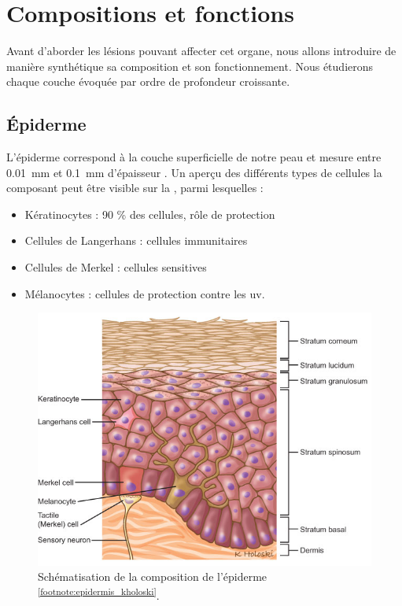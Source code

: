 \section{Compositions et fonctions}
Avant d’aborder les lésions pouvant affecter cet organe, nous allons introduire de manière synthétique sa composition et son fonctionnement. Nous étudierons chaque couche évoquée par ordre de profondeur croissante.\par

\subsection{Épiderme}
L’épiderme correspond à la couche superficielle de notre peau et mesure entre \SI{0,01}{\milli\metre} et \SI{0,1}{\milli\metre} d’épaisseur \cite{Sandby-Moller2003}. Un aperçu des différents types de cellules la composant peut être visible sur la , parmi lesquelles :
\begin{itemize}
\item Kératinocytes : 90 \% des cellules, rôle de protection
\item Cellules de Langerhans : cellules immunitaires
\item Cellules de Merkel : cellules sensitives
\item Mélanocytes : cellules de protection contre les \gls{uv}.
\end{itemize}\par

 \begin{figure}[H]
    \centering
    \includegraphics[width=0.7\linewidth]{contents/chapter_1/resources/epidermis_kholoski.png}
    \caption{Schématisation de la composition de l’épiderme \textsuperscript{\ref{footnote:epidermis_kholoski}}.}
    \label{fig:epidermis_kholoski}
\end{figure}\par


